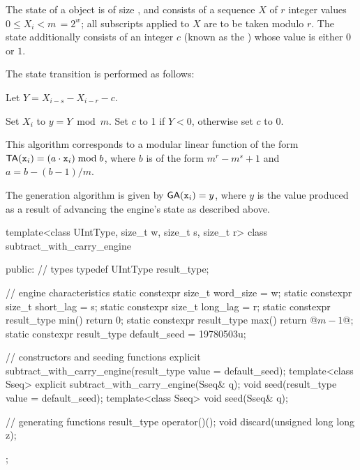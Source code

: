 \pnum
The state%
%
of a  object 
is of size
,
and consists of
a sequence $X$ of $r$ integer values $0 \leq X_i < m \,= 2^w$;
all subscripts applied to $X$ are to be taken modulo $r$.
The state 
additionally consists of an integer $c$
(known as the )%
%
whose value is either $0$ or $1$.

\pnum
The state transition%
%
is performed as follows:
\begin{enumeratea}
 \item
   Let $ Y = X_{i-s} - X_{i-r} - c $.
 \item
   Set $X_i$ to $ y = Y \bmod m $.
   Set $c$ to 1 if $Y < 0$,
   otherwise set $c$ to 0.
\end{enumeratea}
\enternote
 This algorithm corresponds
 to a modular linear function
 of the form
 $ \mathsf{TA}(\texttt{x}_{i}) = (a \cdot \texttt{x}_{i}) \bmod b $,
 where $b$ is of the form
 $ m^r - m^s + 1 $
 and $ a = b - (b-1) / m $.
\exitnote

\pnum
The generation algorithm%
%
is given by
$ \mathsf{GA}(\texttt{x}_{i}) = y $,
where
 $y$
is the value produced
as a result
of advancing the engine's state
as described above.

\begin{codeblock}
template<class UIntType, size_t w, size_t s, size_t r>
 class subtract_with_carry_engine
{
public:
 // types
 typedef UIntType result_type;

 // engine characteristics
 static constexpr size_t word_size = w;
 static constexpr size_t short_lag = s;
 static constexpr size_t long_lag = r;
 static constexpr result_type min() { return 0; }
 static constexpr result_type max() { return @$m - 1$@; }
 static constexpr result_type default_seed = 19780503u;

 // constructors and seeding functions
 explicit subtract_with_carry_engine(result_type value = default_seed);
 template<class Sseq> explicit subtract_with_carry_engine(Sseq& q);
 void seed(result_type value = default_seed);
 template<class Sseq> void seed(Sseq& q);

 // generating functions
 result_type operator()();
 void discard(unsigned long long z);
};
\end{codeblock}


